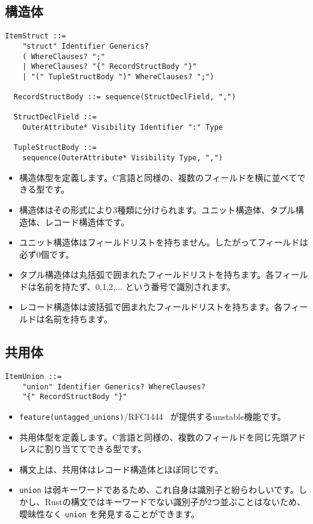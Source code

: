 \documentclass[dvipdfmx,uplatex,papersize,a4paper,10pt]{jsbook}
\theoremstyle{definition}
\begin{document}
\subsection{構造体}

\begin{lstlisting}[language=BNFLike, gobble=2]
  ItemStruct ::=
    "struct" Identifier Generics?
    ( WhereClauses? ";"
    | WhereClauses? "{" RecordStructBody "}"
    | "(" TupleStructBody ")" WhereClauses? ";")

  RecordStructBody ::= sequence(StructDeclField, ",")

  StructDeclField ::=
    OuterAttribute* Visibility Identifier ":" Type

  TupleStructBody ::=
    sequence(OuterAttribute* Visibility Type, ",")
\end{lstlisting}

\begin{itemize}
  \item 構造体型を定義します。C言語と同様の、複数のフィールドを横に並べてできる型です。
  \item 構造体はその形式により3種類に分けられます。ユニット構造体、タプル構造体、レコード構造体です。
  \item ユニット構造体はフィールドリストを持ちません。したがってフィールドは必ず0個です。
  \item タプル構造体は丸括弧で囲まれたフィールドリストを持ちます。各フィールドは名前を持たず、0,1,2,... という番号で識別されます。
  \item レコード構造体は波括弧で囲まれたフィールドリストを持ちます。各フィールドは名前を持ちます。
\end{itemize}

\subsection{共用体}

\begin{lstlisting}[language=BNFLike, gobble=2]
  ItemUnion ::=
    "union" Identifier Generics? WhereClauses?
    "{" RecordStructBody "}"
\end{lstlisting}

\begin{itemize}
  \item \verb|feature(untagged_unions)|/RFC1444~\cite{RustRFC1444} が提供するunstable機能です。
  \item 共用体型を定義します。C言語と同様の、複数のフィールドを同じ先頭アドレスに割り当ててできる型です。
  \item 構文上は、共用体はレコード構造体とほぼ同じです。
  \item \verb|union| は弱キーワードであるため、これ自身は識別子と紛らわしいです。しかし、Rustの構文ではキーワードでない識別子が2つ並ぶことはないため、曖昧性なく \verb|union| を発見することができます。
\end{itemize}
\end{document}
